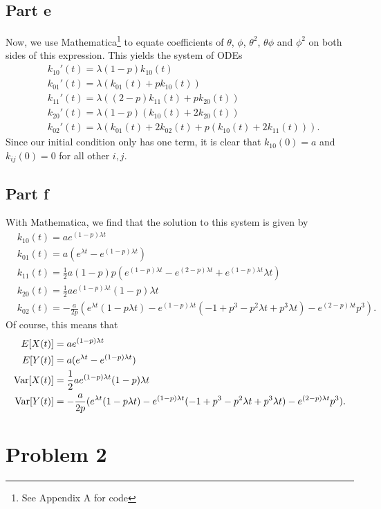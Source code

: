 \documentclass{article}
\begin{document}
\subsection{Part e}
Now, we use Mathematica\footnote{See Appendix A for code} to equate coefficients of $\theta$, $\phi$, $\theta^2$, $\theta \phi$ and $\phi^2$ on both sides of this expression.  This yields the system of ODEs
\begin{align*}
&k_{10}'(t)=\lambda(1-p)k_{10}(t)\\
&k_{01}'(t)=\lambda(k_{01}(t)+pk_{10}(t))\\
&k_{11}'(t)=\lambda((2-p)k_{11}(t)+pk_{20}(t))\\
&k_{20}'(t)=\lambda(1-p)(k_{10}(t)+2k_{20}(t))\\
&k_{02}'(t)=\lambda(k_{01}(t)+2k_{02}(t)+p(k_{10}(t)+2k_{11}(t))).
\end{align*}
Since our initial condition only has one term, it is clear that $k_{10}(0)=a$ and $k_{ij}(0)=0$ for all other $i,j$. 

\subsection{Part f}
With Mathematica, we find that the solution to this system is given by
\begin{align*}
&k_{10}(t)=ae^{(1-p)\lambda t}\\
&k_{01}(t)=a(e^{\lambda t}-e^{(1-p)\lambda t})\\
&k_{11}(t)=\frac{1}{2}a(1-p)p(e^{(1-p)\lambda t}-e^{(2-p)\lambda t}+e^{(1-p)\lambda t}\lambda t)\\
&k_{20}(t)=\frac{1}{2}ae^{(1-p)\lambda t}(1-p)\lambda t\\
&k_{02}(t)=-\frac{a}{2p}(e^{\lambda t}(1-p\lambda t)-e^{(1-p)\lambda t}(-1+p^3-p^2\lambda t+p^3\lambda t)-e^{(2-p)\lambda t}p^3).
\end{align*}
Of course, this means that
\begin{align*}
	E[X(t)]&=ae^{(1-p)\lambda t}\\
	E[Y(t)]&=a(e^{\lambda t}-e^{(1-p)\lambda t})\\
	\operatorname{Var}[X(t)]&=\frac{1}{2}ae^{(1-p)\lambda t}(1-p)\lambda t\\
	\operatorname{Var}[Y(t)]&=-\frac{a}{2p}(e^{\lambda t}(1-p\lambda t)-e^{(1-p)\lambda t}(-1+p^3-p^2\lambda t+p^3\lambda t)-e^{(2-p)\lambda t}p^3).
\end{align*}

\section{Problem 2}
\end{document}
